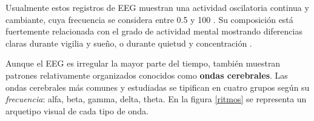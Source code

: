 %
%
%

Usualmente estos registros de EEG muestran una actividad oscilatoria continua y cambiante, cuya
frecuencia se considera entre 0.5 y 100 \hz. Su composición está fuertemente relacionada con el 
grado de actividad mental mostrando diferencias claras durante vigilia y sueño, o durante quietud 
y concentración \cite{Clark98_2}.

Aunque el EEG es irregular la mayor parte del tiempo, también muestran patrones relativamente 
organizados conocidos como \textbf{ondas cerebrales}. 
%
Las ondas cerebrales más comunes y estudiadas se tipifican en cuatro grupos según su 
\textit{frecuencia}: alfa, beta, gamma, delta, theta.
%
En la figura \ref{ritmos} se representa un arquetipo visual de cada tipo de onda.

